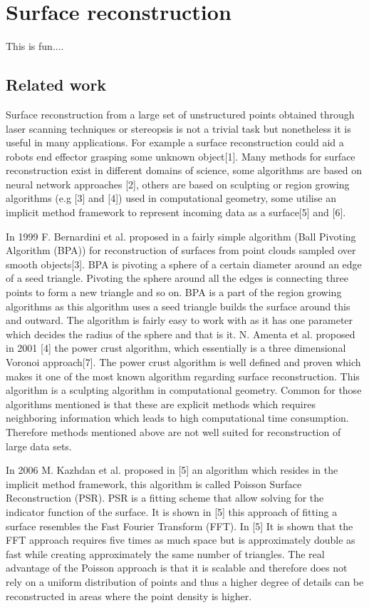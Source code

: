 \section{Surface reconstruction}
This is fun....

\subsection{Related work}
Surface reconstruction from a large set of unstructured points obtained through laser scanning techniques or stereopsis is not a trivial task but nonetheless it is useful in many applications. For example a surface reconstruction could aid a robots end effector grasping some unknown object[1]. Many methods for surface reconstruction exist in different domains of science, some algorithms are based on neural network approaches [2], others are based on sculpting or region growing algorithms (e.g [3] and [4]) used in computational geometry, some utilise an implicit method framework to represent incoming data as a surface[5] and [6].

In 1999 F. Bernardini et al. proposed in a fairly simple algorithm (Ball Pivoting Algorithm (BPA)) for reconstruction of surfaces from point clouds sampled over smooth objects[3]. BPA is pivoting a sphere of a certain diameter around an edge of a seed triangle. Pivoting the sphere around all the edges is connecting three points to form a new triangle and so on. BPA is a part of the region growing algorithms as this algorithm uses a seed triangle builds the surface around this and outward. The algorithm is fairly easy to work with as it has one parameter which decides the radius of the sphere and that is it. N. Amenta et al. proposed in 2001 [4] the power crust algorithm, which essentially is a three dimensional Voronoi approach[7]. The power crust algorithm is well defined and proven which makes it one of the most known algorithm regarding surface reconstruction. This algorithm is a sculpting algorithm in computational geometry. Common for those algorithms mentioned is that these are explicit methods which requires neighboring information which leads to high computational time consumption. Therefore methods mentioned above are not well suited for reconstruction of large data sets.

In 2006 M. Kazhdan et al. proposed in [5] an algorithm which resides in the implicit method framework, this algorithm is called Poisson Surface Reconstruction (PSR). PSR is a fitting scheme that allow solving for the indicator function of the surface. It is shown in [5] this approach of fitting a surface resembles the Fast Fourier Transform (FFT). In [5] It is shown that the FFT approach requires five times as much space but is approximately double as fast while creating approximately the same number of triangles. The real advantage of the Poisson approach is that it is scalable and therefore does not rely on a uniform distribution of points and thus a higher degree of details can be reconstructed in areas where the point density is higher.

